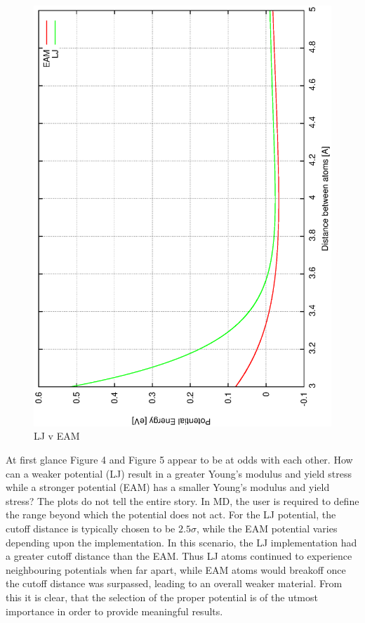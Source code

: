 \documentclass{article}
\begin{document}
\begin{figure}[h!]
\centering
\includegraphics[totalheight=0.5\textheight, angle=-90]{disp_curve}
\caption{LJ v EAM}
\label{fig:aNicePicture}
\end{figure}
At first glance Figure 4 and Figure 5 appear to be at odds with each other. How can a weaker potential (LJ) result in a greater Young's modulus and yield stress while a stronger potential (EAM) has a smaller Young's modulus and yield stress? The plots do not tell the entire story. In MD, the user is required to define the range beyond which the potential does not act. For the LJ potential, the cutoff distance is typically chosen to be $2.5\sigma$, while the EAM potential varies depending upon the implementation. In this scenario, the LJ implementation had a greater cutoff distance than the EAM. Thus LJ atoms continued to experience neighbouring potentials when far apart, while EAM atoms would breakoff once the cutoff distance was surpassed, leading to an overall weaker material. From this it is clear, that the selection of the proper potential is of the utmost importance in order to provide meaningful results.
\end{document}
